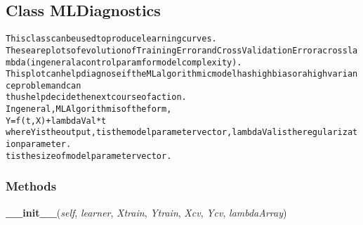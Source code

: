 
\subsection{Class MLDiagnostics}

    \label{QSTK:qstklearn:mldiagnostics:MLDiagnostics}
\begin{alltt}

This class can be used to produce learning curves.
These are plots of evolution of Training Error and Cross Validation Error across lambda(in general a control param for model complexity).
This plot can help diagnose if the ML algorithmic model has high bias or a high variance problem and can
thus help decide the next course of action.
In general, ML Algorithm is of the form,
        Y=f(t,X) + lambdaVal*{\textbar}t{\textbar}
        where Y is the output, t is the model parameter vector, lambdaVal is the regularization parameter.
        {\textbar}t{\textbar} is the size of model parameter vector.
\end{alltt}



  \subsubsection{Methods}

    \label{QSTK:qstklearn:mldiagnostics:MLDiagnostics:__init__}

    \vspace{0.5ex}

\hspace{.8\funcindent}\begin{boxedminipage}{\funcwidth}

    \raggedright \textbf{\_\_init\_\_}(\textit{self}, \textit{learner}, \textit{Xtrain}, \textit{Ytrain}, \textit{Xcv}, \textit{Ycv}, \textit{lambdaArray})

\setlength{\parskip}{2ex}
\setlength{\parskip}{1ex}
    \end{boxedminipage}

